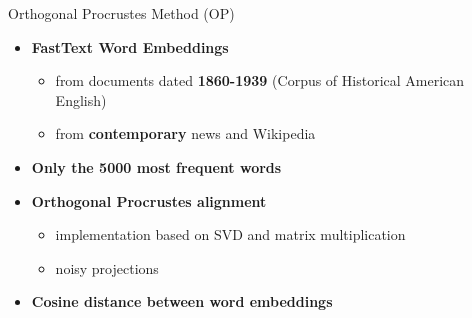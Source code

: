 \documentclass[10pt,aspectratio=1610,professionalfont]{beamer}
\begin{document}
\begin{frame}{Orthogonal Procrustes Method (OP)}
    \begin{itemize}
        \item \textbf{FastText Word Embeddings}
        \begin{itemize}
            \item from documents dated \textbf{1860-1939} (Corpus of Historical American English)
            \item from \textbf{contemporary} news and Wikipedia  
        \end{itemize}
        \item \textbf{Only the 5000 most frequent words}
        \item \textbf{Orthogonal Procrustes alignment}
        \begin{itemize}
            \item implementation based on SVD and matrix multiplication
            \item noisy projections 
        \end{itemize}
        \item \textbf{Cosine distance between word embeddings}
    \end{itemize}
\end{frame}
\end{document}
